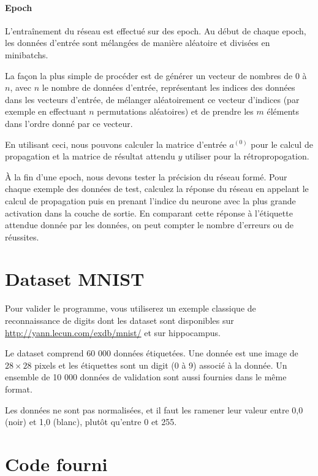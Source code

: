 \documentclass[11pt]{paper}
\begin{document}
\paragraph{Epoch} 

L'entraînement du réseau est effectué sur des epoch. Au début de chaque epoch, les données d'entrée sont mélangées de manière aléatoire et divisées en minibatchs.

La façon la plus simple de procéder est de générer un vecteur de nombres de 0 à $n$, avec $n$ le nombre de données d'entrée, représentant les indices des données dans les vecteurs d'entrée, de mélanger aléatoirement ce vecteur d'indices (par exemple en effectuant $n$ permutations aléatoires) et de prendre les $m$ éléments dans l'ordre donné par ce vecteur.

En utilisant ceci, nous pouvons calculer la matrice d'entrée $a^{(0)}$ pour le calcul de propagation et la matrice de résultat attendu $y$ utiliser   pour la rétropropogation.

À la fin d'une epoch, nous devons tester la précision du réseau formé. Pour chaque exemple des données de test, calculez la réponse du réseau en appelant le calcul de propagation puis en prenant l'indice du neurone avec la plus grande activation dans la couche de sortie. En comparant cette réponse à l'étiquette attendue donnée par les données, on peut compter le nombre d'erreurs ou de réussites. 

  \section{Dataset MNIST}

Pour valider le programme, vous utiliserez un exemple classique de reconnaissance de digits dont les dataset sont disponibles sur \href{http://yann.lecun.com/exdb/mnist/}{http://yann.lecun.com/exdb/mnist/} et sur hippocampus.

Le dataset comprend 60 000 données étiquetées. Une donnée est une image de $28\times28$ pixels et les étiquettes sont un digit (0 à 9) associé à la donnée. Un ensemble de 10 000 données de validation sont aussi fournies dans le même format.

Les données ne sont pas normalisées, et il faut les ramener leur valeur entre 0,0 (noir) et 1,0 (blanc), plutôt qu'entre 0 et 255.


  \section{Code fourni}
\end{document}
